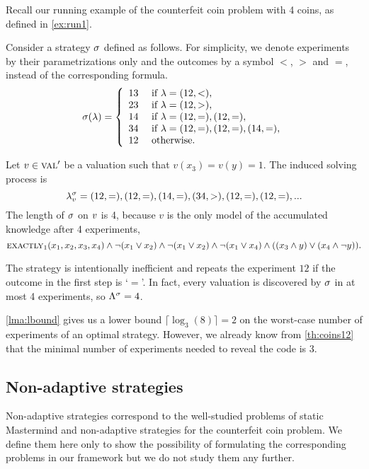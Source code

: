 \begin{example} \label{ex:run2}
Recall our running example of the counterfeit coin problem with 4 coins,
as defined in \autoref{ex:run1}.

Consider a strategy $\sigma$ defined as follows.
For simplicity, we denote experiments by their parametrizations only
  and the outcomes by a symbol $<$, $>$ and $=$,
  instead of the corresponding formula.
\[
\sigma(\lambda) = \left\{\begin{array}{ll}
13 & \textrm{ if } \lambda = (12, <), \\
23 & \textrm{ if } \lambda = (12, >),\\
14 & \textrm{ if } \lambda = (12, =), (12, =), \\
34 & \textrm{ if } \lambda = (12, =), (12, =), (14, =), \\
12 & \textrm{ otherwise.}
\end{array}\right.
\]

Let $v\in\textsc{val}'$ be a valuation such that $v(x_3) = v(y) = 1$.
The induced solving process is
\[
\lambda^{\sigma}_{v} = (12, =), (12, =), (14, =), (34, >), (12, =), (12, =), ...
\]
The length of $\sigma$ on $v$ is 4, because $v$ is the only model of
  the accumulated knowledge after 4 experiments,
\[
\textsc{exactly}_1(x_1,x_2,x_3,x_4) \wedge \neg(x_1 \vee x_2) \wedge \neg(x_1 \vee x_2)
\wedge \neg(x_1 \vee x_4) \wedge ((x_3 \wedge y) \vee (x_4 \wedge \neg y)).
\]

The strategy is intentionally inefficient and repeats the experiment $12$
if the outcome in the first step is `$=$'.
In fact, every valuation is discovered by $\sigma$ in at most 4 experiments,
  so $\Lambda^{\sigma} = 4$.

\autoref{lma:lbound} gives us a lower bound $ \lceil\log_3(8)\rceil = 2$
 on the worst-case number of experiments of an optimal strategy.
However, we already know from \autoref{th:coins12} that the minimal number
  of experiments needed to reveal the code is 3.
\end{example}

\subsection{Non-adaptive strategies}

Non-adaptive strategies correspond to the well-studied problems of
  static Mastermind and
  non-adaptive strategies for
  the counterfeit coin problem\cite{mm-static}\cite{coins-nonadaptive}.
We define them here only to show the possibility of formulating the
  corresponding problems
  in our framework but we do not study them any further.

